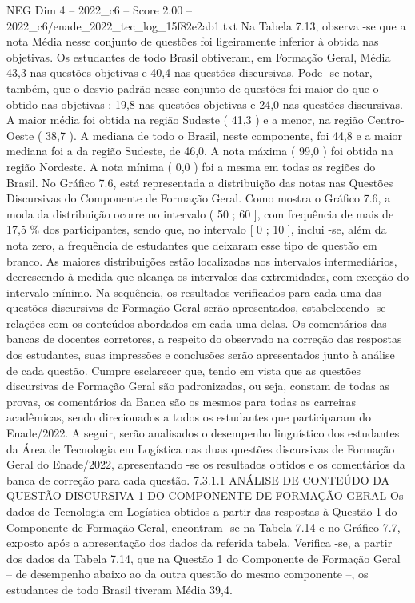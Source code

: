\begin{textsample}{NEG Dim 4 – 2022\_c6 – Score 2.00 – 2022\_c6/enade\_2022\_tec\_log\_15f82e2ab1.txt}
Na Tabela 7.13, observa -se que a nota Média nesse conjunto de questões foi ligeiramente inferior à obtida nas objetivas.
Os estudantes de todo Brasil obtiveram, em Formação Geral, Média 43,3 nas questões objetivas e 40,4 nas questões discursivas.
Pode -se notar, também, que o desvio-padrão nesse conjunto de questões foi maior do que o obtido nas objetivas : 19,8 nas questões objetivas e 24,0 nas questões discursivas.
A maior média foi obtida na região Sudeste ( 41,3 ) e a menor, na região Centro-Oeste ( 38,7 ).
A mediana de todo o Brasil, neste componente, foi 44,8 e a maior mediana foi a da região Sudeste, de 46,0.
A nota máxima ( 99,0 ) foi obtida na região Nordeste.
A nota mínima ( 0,0 ) foi a mesma em todas as regiões do Brasil.
No Gráfico 7.6, está representada a distribuição das notas nas Questões Discursivas do Componente de Formação Geral.
Como mostra o Gráfico 7.6, a moda da distribuição ocorre no intervalo ( 50 ; 60 ], com frequência de mais de 17,5 \% dos participantes, sendo que, no intervalo [ 0 ; 10 ], inclui -se, além da nota zero, a frequência de estudantes que deixaram esse tipo de questão em branco.
As maiores distribuições estão localizadas nos intervalos intermediários, decrescendo à medida que alcança os intervalos das extremidades, com exceção do intervalo mínimo.
Na sequência, os resultados verificados para cada uma das questões discursivas de Formação Geral serão apresentados, estabelecendo -se relações com os conteúdos abordados em cada uma delas.
Os comentários das bancas de docentes corretores, a respeito do observado na correção das respostas dos estudantes, suas impressões e conclusões serão apresentados junto à análise de cada questão.
Cumpre esclarecer que, tendo em vista que as questões discursivas de Formação Geral são padronizadas, ou seja, constam de todas as provas, os comentários da Banca são os mesmos para todas as carreiras acadêmicas, sendo direcionados a todos os estudantes que participaram do Enade/2022.
A seguir, serão analisados o desempenho linguístico dos estudantes da Área de Tecnologia em Logística nas duas questões discursivas de Formação Geral do Enade/2022, apresentando -se os resultados obtidos e os comentários da banca de correção para cada questão. 7.3.1.1 ANÁLISE DE CONTEÚDO DA QUESTÃO DISCURSIVA 1 DO COMPONENTE DE FORMAÇÃO GERAL Os dados de Tecnologia em Logística obtidos a partir das respostas à Questão 1 do Componente de Formação Geral, encontram -se na Tabela 7.14 e no Gráfico 7.7, exposto após a apresentação dos dados da referida tabela.
Verifica -se, a partir dos dados da Tabela 7.14, que na Questão 1 do Componente de Formação Geral – de desempenho abaixo ao da outra questão do mesmo componente –, os estudantes de todo Brasil tiveram Média 39,4.

\end{textsample}
